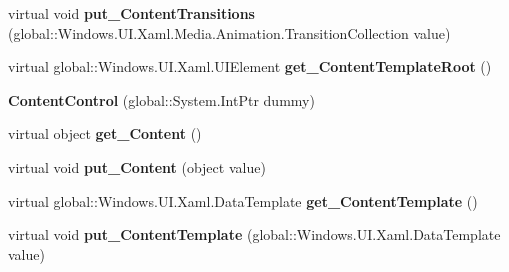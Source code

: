 \begin{DoxyCompactItemize}
\item 
\mbox{\label{class_windows_1_1_u_i_1_1_xaml_1_1_controls_1_1_content_control_aa5fc9bac28b70e7fe86efcb229e8c57d}} 
virtual void {\bfseries put\+\_\+\+Content\+Transitions} (global\+::\+Windows.\+U\+I.\+Xaml.\+Media.\+Animation.\+Transition\+Collection value)
\item 
\mbox{\label{class_windows_1_1_u_i_1_1_xaml_1_1_controls_1_1_content_control_a1b8d96eef56757cec1eb123b64b62fe4}} 
virtual global\+::\+Windows.\+U\+I.\+Xaml.\+U\+I\+Element {\bfseries get\+\_\+\+Content\+Template\+Root} ()
\item 
\mbox{\label{class_windows_1_1_u_i_1_1_xaml_1_1_controls_1_1_content_control_a54ac07e93dd29c05ab129eb11a433a57}} 
{\bfseries Content\+Control} (global\+::\+System.\+Int\+Ptr dummy)
\item 
\mbox{\label{class_windows_1_1_u_i_1_1_xaml_1_1_controls_1_1_content_control_a1398a502667d7adf98f72f4ae5c485c9}} 
virtual object {\bfseries get\+\_\+\+Content} ()
\item 
\mbox{\label{class_windows_1_1_u_i_1_1_xaml_1_1_controls_1_1_content_control_ac840a1532f5f739ccb323a723b58454b}} 
virtual void {\bfseries put\+\_\+\+Content} (object value)
\item 
\mbox{\label{class_windows_1_1_u_i_1_1_xaml_1_1_controls_1_1_content_control_a5cc3b93bc15a1c9c0ed277ec8dc6dfe9}} 
virtual global\+::\+Windows.\+U\+I.\+Xaml.\+Data\+Template {\bfseries get\+\_\+\+Content\+Template} ()
\item 
\mbox{\label{class_windows_1_1_u_i_1_1_xaml_1_1_controls_1_1_content_control_ab0e5c4f7859f68ed01991a8e932e4bda}} 
virtual void {\bfseries put\+\_\+\+Content\+Template} (global\+::\+Windows.\+U\+I.\+Xaml.\+Data\+Template value)
\item 
\mbox{\label{class_windows_1_1_u_i_1_1_xaml_1_1_controls_1_1_content_control_a074c0bbf88ba02121501aea5d840d64f}} 

\end{DoxyCompactItemize}
